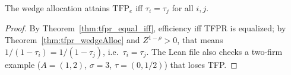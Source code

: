 \begin{theorem}
\label{thm:wedgeAlloc_efficient_iff}
\leanok
{}
The wedge allocation attains $\mathrm{TFP}_e$ iff $\tau_i = \tau_j$ for all $i, j$.
\end{theorem}
\begin{proof}
\leanok
By Theorem~\ref{thm:tfpr_equal_iff}, efficiency iff TFPR is equalized; by Theorem~\ref{thm:tfpr_wedgeAlloc} and
$Z^{1-\rho} > 0$, that means $1/(1-\tau_i) = 1/(1-\tau_j)$, i.e.\ $\tau_i = \tau_j$. The Lean file also checks
a two-firm example ($A = (1, 2)$, $\sigma = 3$, $\tau = (0, 1/2)$) that loses TFP.
\end{proof}
